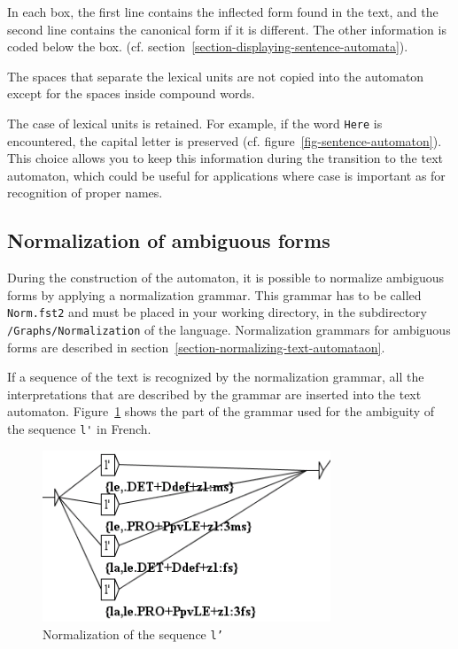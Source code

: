 \bigskip
\noindent In each box, the first line contains the inflected form found in the
text, and the second line contains the canonical form if it is different. The other
information is coded below the box.
(cf. section~\ref{section-displaying-sentence-automata}).

\bigskip
\noindent The spaces that separate the lexical units are not copied into the
automaton except for the spaces inside compound words.

\bigskip
\noindent The case of lexical units is retained. For example, if the word
\verb+Here+ is encountered, the capital letter is preserved (cf.
figure~\ref{fig-sentence-automaton}). This choice allows you to
keep this information during the transition to the text automaton,
which could be useful for applications where case is important as for
recognition of proper names.

\subsection{Normalization of ambiguous forms}
During the construction of the automaton, it is possible to normalize
ambiguous forms by applying a normalization grammar. This grammar has to be
called \verb+Norm.fst2+ and must be placed in your working directory, in the
subdirectory \verb+/Graphs/Normalization+ of the language. Normalization
grammars for ambiguous forms are described in
section~\ref{section-normalizing-text-automataon}.

\bigskip
\noindent If a sequence of the text is recognized by the normalization grammar, all the
interpretations that are described by the grammar are inserted into the text
automaton.
Figure~\ref{fig-example-tfst-normalization-graph} shows
the part of the grammar used for the ambiguity of the sequence \verb+l'+ in French.

\begin{figure}[!ht]
\begin{center}
\includegraphics[width=8.6cm]{resources/img/fig7-4.png}
\caption{Normalization of the sequence \texttt{l'}\label{fig-example-tfst-normalization-graph}}
\end{center}
\end{figure}


